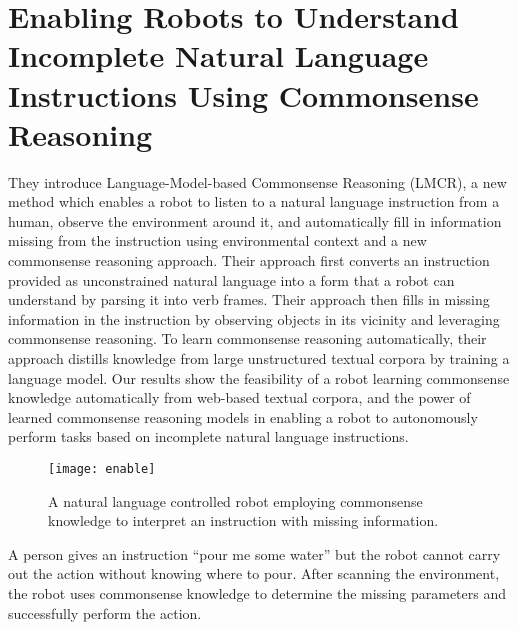 \section{Enabling Robots to Understand Incomplete Natural Language Instructions Using Commonsense Reasoning~\cite{DBLP:journals/corr/TesslerGZMM16}}
They introduce Language-Model-based Commonsense Reasoning (LMCR), a new method which enables a robot to listen to a natural language instruction from a human, observe the environment around it, and automatically fill in information missing from the instruction using environmental context and a new commonsense reasoning approach. Their approach first converts an instruction provided as  unconstrained natural language into a form that a robot can understand by parsing it into verb frames. 
Their approach then fills in missing information in the instruction by observing objects in its vicinity and leveraging commonsense reasoning. To learn commonsense reasoning automatically, their approach distills knowledge from large unstructured textual corpora by training a language model. Our results show the feasibility of a robot learning commonsense knowledge automatically from web-based textual corpora, and the power of learned commonsense reasoning models in enabling a robot to autonomously perform tasks based on incomplete natural language instructions. 
\begin{figure}[htbp]
    \centering
    \texttt{[image: enable]}
    \caption{A natural language controlled robot employing commonsense knowledge to interpret an instruction with missing information. }
    \label{fig:enable}
\end{figure}

A person gives an instruction “pour me some water” but the robot cannot carry out the action without knowing where to pour. After scanning the environment, the robot uses commonsense knowledge to determine the missing parameters and successfully perform the action.


